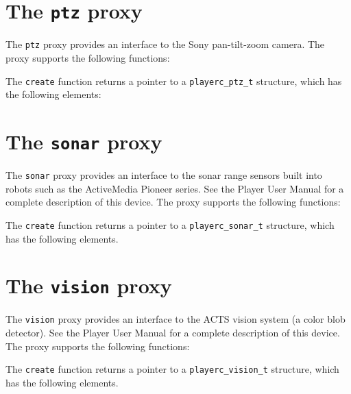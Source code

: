 \documentclass[11pt]{report}
\begin{document}
\newpage
\section{The {\tt ptz} proxy}

The {\tt ptz} proxy provides an interface to the Sony pan-tilt-zoom
camera.  The proxy supports the following
functions:
\begin{quote}

\end{quote}
The {\tt create} function returns a pointer to a {\tt playerc\_ptz\_t}
structure, which has the following elements:
\begin{quote}

\end{quote}


\newpage
\section{The {\tt sonar} proxy}

The {\tt sonar} proxy provides an interface to the sonar range sensors
built into robots such as the ActiveMedia Pioneer series.  See the
Player User Manual for a complete description of this device.  The
proxy supports the following functions:
\begin{quote}

\end{quote}
The {\tt create} function returns a pointer to a {\tt playerc\_sonar\_t}
structure, which has the following elements.
\begin{quote}

\end{quote}


\newpage
\section{The {\tt vision} proxy}

The {\tt vision} proxy provides an interface to the ACTS vision system
(a color blob detector).  See the Player User Manual for a complete
description of this device.  The proxy supports the following
functions:
\begin{quote}

\end{quote}
The {\tt create} function returns a pointer to a {\tt playerc\_vision\_t}
structure, which has the following elements.
\begin{quote}

\end{quote}
\end{document}
